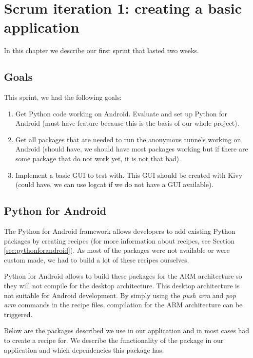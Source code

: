 \chapter{Scrum iteration 1: creating a basic application}
\label{cpt:iteration1}
	In this chapter we describe our first sprint that lasted two weeks.

	\section{Goals}
		This sprint, we had the following goals:
	
		\begin{enumerate}
			\item Get Python code working on Android. Evaluate and set up Python for Android (must have feature because this is the basis of our whole project).
			\item Get all packages that are needed to run the anonymous tunnels working on Android (should have, we should have most packages working but if there are some package that do not work yet, it is not that bad).
			\item Implement a basic GUI to test with. This GUI should be created with Kivy (could have, we can use logcat if we do not have a GUI available).
		\end{enumerate}
	
	\section{Python for Android}
		The Python for Android framework allows developers to add existing Python packages by creating recipes (for more information about recipes, see Section \ref{sec:pythonforandroid}). As most of the packages were not available or were custom made, we had to build a lot of these recipes ourselves.
	
		Python for Android allows to build these packages for the ARM architecture so they will not compile for the desktop architecture. This desktop architecture is not suitable for Android development. By simply using the \emph{push arm} and \emph{pop arm} commands in the recipe files, compilation for the ARM architecture can be triggered.
	
		Below are the packages described we use in our application and in most cases had to create a recipe for. We describe the functionality of the package in our application and which dependencies this package has.
	
